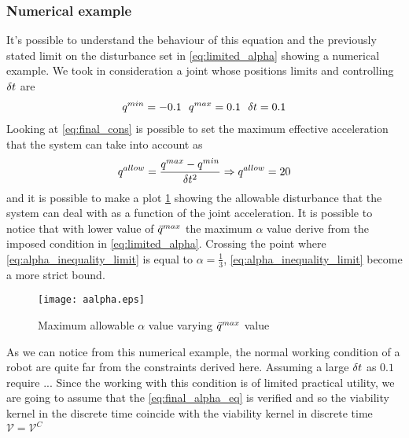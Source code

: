\documentclass{article}
\begin{document}
\subsubsection*{Numerical example}
It's possible to understand the behaviour of this equation and the previously stated limit on the disturbance set in \ref{eq:limited_alpha} showing a numerical example. We took in consideration a joint whose positions limits and controlling $\delta t$ are
\begin{equation} \begin{aligned}
    q^{min}=-0.1  \ \ q^{max}=0.1 \ \ \delta t=0.1
    \end{aligned}
\end{equation}
Looking at \ref{eq:final_cons} is possible to set the maximum effective acceleration that the system can take into account as 
\begin{equation}
    q^{allow}=\frac{q^{max}-q^{min}}{\delta t^2} \Rightarrow q^{allow} = 20
\end{equation}
and it is possible to make a plot \ref{fig:Allowable_alpha} showing the allowable disturbance that the system can deal with as a function of the joint acceleration. It is possible to notice that with lower value of $\ddot{q}^{max}$ the maximum $\alpha$ value derive from the imposed condition in \ref{eq:limited_alpha}. Crossing the point where \ref{eq:alpha_inequality_limit} is equal to $\alpha=\frac{1}{3}$, \ref{eq:alpha_inequality_limit} become a more strict bound.

\begin{figure}[H]
    \centering
    \texttt{[image: aalpha.eps]}
    \caption{Maximum allowable $\alpha$ value varying $\ddot{q}^{max}$ value  }
    \label{fig:Allowable_alpha}
\end{figure}
As we can notice from this numerical example, the normal working condition of a robot are quite far from the constraints derived here. Assuming a large $\delta t$ as $0.1$ require ... Since the working with this condition is of limited practical utility, we are going to assume that the \ref{eq:final_alpha_eq} is verified and so the viability kernel in the discrete time coincide with the viability kernel in discrete time $\mathcal{V}=\mathcal{V}^{C}$
\end{document}
